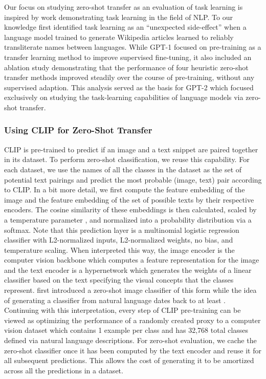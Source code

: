 \documentclass{article}
\begin{document}
Our focus on studying zero-shot transfer as an evaluation of task learning is inspired by work demonstrating task learning in the field of NLP. To our knowledge \citet{liu2018generating} first identified task learning as an ``unexpected side-effect'' when a language model trained to generate Wikipedia articles learned to reliably transliterate names between languages. While GPT-1 \citep{radford2018improving} focused on pre-training as a transfer learning method to improve supervised fine-tuning, it also included an ablation study demonstrating that the performance of four heuristic zero-shot transfer methods improved steadily over the course of pre-training, without any supervised adaption. This analysis served as the basis for GPT-2 \citep{radford2019language} which focused exclusively on studying the task-learning capabilities of language models via zero-shot transfer.



\subsubsection{Using CLIP for Zero-Shot Transfer}

CLIP is pre-trained to predict if an image and a text snippet are paired together in its dataset. To perform zero-shot classification, we reuse this capability. For each dataset, we use the names of all the classes in the dataset as the set of potential text pairings and predict the most probable (image, text) pair according to CLIP. In a bit more detail, we first compute the feature embedding of the image and the feature embedding of the set of possible texts by their respective encoders. The cosine similarity of these embeddings is then calculated, scaled by a temperature parameter , and normalized into a probability distribution via a softmax. Note that this prediction layer is a multinomial logistic regression classifier with L2-normalized inputs, L2-normalized weights, no bias, and temperature scaling. When interpreted this way, the image encoder is the computer vision backbone which computes a feature representation for the image and the text encoder is a hypernetwork \citep{ha2016hypernetworks} which generates the weights of a linear classifier based on the text specifying the visual concepts that the classes represent. \citet{lei2015predicting} first introduced a zero-shot image classifier of this form while the idea of generating a classifier from natural language dates back to at least \citet{elhoseiny2013write}. Continuing with this interpretation, every step of CLIP pre-training can be viewed as optimizing the performance of a randomly created proxy to a computer vision dataset which contains 1 example per class and has 32,768 total classes defined via natural language descriptions. For zero-shot evaluation, we cache the zero-shot classifier once it has been computed by the text encoder and reuse it for all subsequent predictions. This allows the cost of generating it to be amortized across all the predictions in a dataset.
\end{document}
